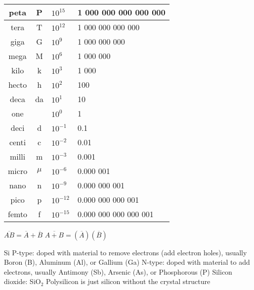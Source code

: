 \documentclass[12pt]{article}
\begin{document}
\begin{spacing}{0.8}
\begin{multicols*}{2}
\begin{flushleft}
\begin{outline}[longenum]
 \\
\begin{tabular}{|c c l l|}                                   \hline
peta  & P     & $10^{ 15}$ & \hfill 1 000 000 000 000 000 \\ \hline
tera  & T     & $10^{ 12}$ & \hfill     1 000 000 000 000 \\ \hline
giga  & G     & $10^{  9}$ & \hfill         1 000 000 000 \\ \hline
mega  & M     & $10^{  6}$ & \hfill             1 000 000 \\ \hline
kilo  & k     & $10^{  3}$ & \hfill                 1 000 \\ \hline
hecto & h     & $10^{  2}$ & \hfill                   100 \\ \hline
deca  & da    & $10^{  1}$ & \hfill                    10 \\ \hline
one   &       & $10^{ 0 }$ & \hfill       1 \hfill \hfill \\ \hline
deci  & d     & $10^{- 1}$ & 0.1                          \\ \hline
centi & c     & $10^{- 2}$ & 0.01                         \\ \hline
milli & m     & $10^{- 3}$ & 0.001                        \\ \hline
micro & $\mu$ & $10^{- 6}$ & 0.000 001                    \\ \hline
nano  & n     & $10^{- 9}$ & 0.000 000 001                \\ \hline
pico  & p     & $10^{-12}$ & 0.000 000 000 001            \\ \hline
femto & f     & $10^{-15}$ & 0.000 000 000 000 001        \\ \hline
\end{tabular}

  \1 $\overline{AB}=\overline {A}+\overline{B}$
  \1 $\overline{A+B}=(\overline{A})(\overline{B})$

  \1 Si
  \1 P-type:
    \2 doped with material to remove electrons (add electron holes), usually Boron (B), Aluminum (Al), or Gallium (Ga)
  \1 N-type:
    \2 doped with material to add electrons, usually Antimony (Sb), Arsenic (As), or Phosphorous (P)
  \1 Silicon dioxide: SiO$_2$
  \1 Polysilicon is just silicon without the crystal structure


\end{outline}
\end{flushleft}
\end{multicols*}
\end{spacing}
\end{document}
